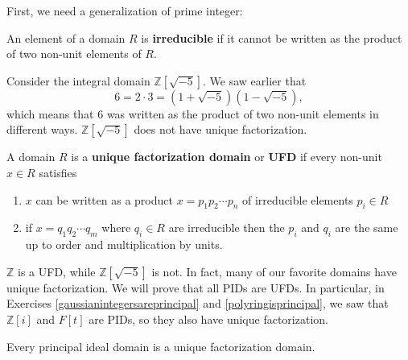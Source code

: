 First, we need a generalization of prime integer:
\begin{definition} 
An element of a domain $R$ is \textbf{irreducible} if it cannot be written
as the product of two non-unit elements of $R$.
\end{definition} 

\begin{example} 
Consider the integral domain $\mathbb{Z}[\sqrt{-5}]$. We saw earlier that 
\[ 
6 = 2 \cdot 3 = (1 + \sqrt{-5})(1 - \sqrt{-5}),
\] 
which means that $6$ was written as the product of two non-unit elements in
different ways. $\mathbb{Z}[\sqrt{-5}]$ does not have unique factorization.
\end{example} 

\begin{definition} 
A domain $R$ is a \textbf{unique factorization domain} or \textbf{UFD} if every
non-unit $x \in R$ satisfies
\begin{enumerate}
\item $x$ can be written as a product $x = p_1 p_2 \cdots p_n$ of 
irreducible elements $p_i \in R$
\item if $x = q_1 q_2 \cdots q_m$ where $q_i \in R$ are irreducible
then the $p_i$ and $q_i$ are the same up to order and multiplication by units.
\end{enumerate}
\end{definition} 

\begin{example}
$\mathbb{Z}$ is a UFD, while $\mathbb{Z}[\sqrt{-5}]$ is not. In fact, many of
our favorite domains have unique factorization. We will prove that all PIDs 
are UFDs. In particular, in Exercises \ref{gaussianintegersareprincipal} and
\ref{polyringisprincipal}, we saw that $\mathbb{Z}[i]$ and $F[t]$ are PIDs,
so they also have unique factorization.
\end{example}

\begin{theorem} 
Every principal ideal domain is a unique factorization domain.
\end{theorem} 

